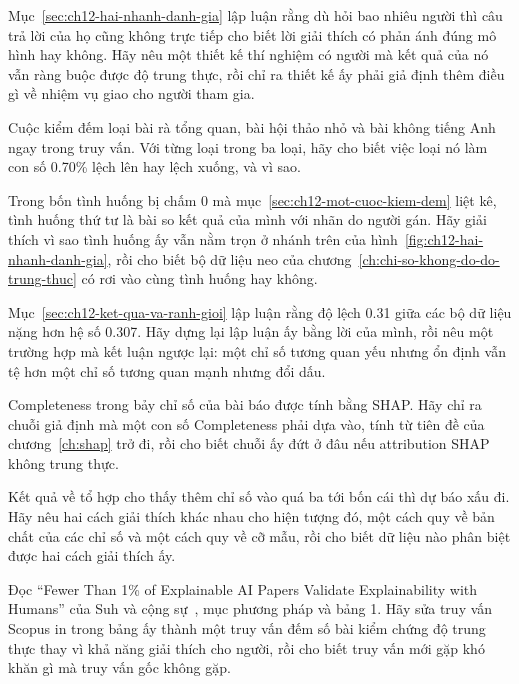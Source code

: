 \cauhoi
\begin{cauhoids}
  \item Mục~\ref{sec:ch12-hai-nhanh-danh-gia} lập luận rằng dù hỏi bao nhiêu
  người thì câu trả lời của họ cũng không trực tiếp cho biết lời giải thích có
  phản ánh đúng mô hình hay không. Hãy nêu một thiết kế thí nghiệm có người mà
  kết quả của nó vẫn ràng buộc được độ trung thực, rồi chỉ ra thiết kế ấy phải
  giả định thêm điều gì về nhiệm vụ giao cho người tham gia.
  \item Cuộc kiểm đếm loại bài rà tổng quan, bài hội thảo nhỏ và bài không
  tiếng Anh ngay trong truy vấn. Với từng loại trong ba loại, hãy cho biết việc
  loại nó làm con số 0.70\% lệch lên hay lệch xuống, và vì sao.
  \item Trong bốn tình huống bị chấm 0 mà mục~\ref{sec:ch12-mot-cuoc-kiem-dem}
  liệt kê, tình huống thứ tư là bài so kết quả của mình với nhãn do người gán.
  Hãy giải thích vì sao tình huống ấy vẫn nằm trọn ở nhánh trên của
  hình~\ref{fig:ch12-hai-nhanh-danh-gia}, rồi cho biết bộ dữ liệu neo của
  chương~\ref{ch:chi-so-khong-do-do-trung-thuc} có rơi vào cùng tình huống hay
  không.
  \item Mục~\ref{sec:ch12-ket-qua-va-ranh-gioi} lập luận rằng độ lệch 0.31 giữa
  các bộ dữ liệu nặng hơn hệ số 0.307. Hãy dựng lại lập luận ấy bằng lời của
  mình, rồi nêu một trường hợp mà kết luận ngược lại: một chỉ số tương quan yếu
  nhưng ổn định vẫn tệ hơn một chỉ số tương quan mạnh nhưng đổi dấu.
  \item Completeness trong bảy chỉ số của bài báo được tính bằng SHAP. Hãy chỉ
  ra chuỗi giả định mà một con số Completeness phải dựa vào, tính từ tiên đề
  của chương~\ref{ch:shap} trở đi, rồi cho biết chuỗi ấy đứt ở đâu nếu
  attribution SHAP không trung thực.
  \item Kết quả về tổ hợp cho thấy thêm chỉ số vào quá ba tới bốn cái thì dự
  báo xấu đi. Hãy nêu hai cách giải thích khác nhau cho hiện tượng đó, một cách
  quy về bản chất của các chỉ số và một cách quy về cỡ mẫu, rồi cho biết dữ
  liệu nào phân biệt được hai cách giải thích ấy.
  \item Đọc \enquote{Fewer Than 1\% of Explainable AI Papers Validate
  Explainability with Humans} của Suh và cộng sự~\autocite{p24humangap}, mục
  phương pháp và bảng 1. Hãy sửa truy vấn Scopus in trong bảng ấy thành một
  truy vấn đếm số bài kiểm chứng độ trung thực thay vì khả năng giải thích cho
  người, rồi cho biết truy vấn mới gặp khó khăn gì mà truy vấn gốc không gặp.
\end{cauhoids}
